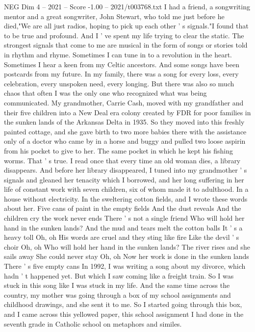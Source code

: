 \begin{textsample}{NEG Dim 4 – 2021 – Score -1.00 – 2021/t003768.txt}  \label{ex:f4_neg_049}
I had a friend, a songwriting mentor and a great songwriter, John Stewart, who told me just before he died,"We are all just radios, hoping to pick up each other ' s signals."I found that to be true and profound.
And I ' ve spent my life trying to clear the static.
The strongest signals that come to me are musical in the form of songs or stories told in rhythm and rhyme.
Sometimes I can tune in to a revolution in the heart.
Sometimes I hear a keen from my Celtic ancestors.
And some songs have been postcards from my future.
In my family, there was a song for every loss, every celebration, every unspoken need, every longing.
But there was also so much chaos that often I was the only one who recognized what was being communicated.
My grandmother, Carrie Cash, moved with my grandfather and their five children into a New Deal era colony created by FDR for poor families in the sunken lands of the Arkansas Delta in 1935.
So they moved into this freshly painted cottage, and she gave birth to two more babies there with the assistance only of a doctor who came by in a horse and buggy and pulled two loose aspirin from his pocket to give to her.
The same pocket in which he kept his fishing worms.
That ' s true.
I read once that every time an old woman dies, a library disappears.
And before her library disappeared, I tuned into my grandmother ' s signals and gleaned her tenacity which I borrowed, and her long suffering in her life of constant work with seven children, six of whom made it to adulthood.
In a house without electricity.
In the sweltering cotton fields, and I wrote these words about her.
Five cans of paint in the empty fields And the dust reveals And the children cry the work never ends There ' s not a single friend Who will hold her hand in the sunken lands?
And the mud and tears melt the cotton balls It ' s a heavy toll Oh, oh His words are cruel and they sting like fire Like the devil ' s choir Oh, oh Who will hold her hand in the sunken lands?
The river rises and she sails away She could never stay Oh, oh Now her work is done in the sunken lands There ' s five empty cans In 1992, I was writing a song about my divorce, which hadn ' t happened yet.
But which I saw coming like a freight train.
So I was stuck in this song like I was stuck in my life.
And the same time across the country, my mother was going through a box of my school assignments and childhood drawings, and she sent it to me.
So I started going through this box, and I came across this yellowed paper, this school assignment I had done in the seventh grade in Catholic school on metaphors and similes.

\end{textsample}
